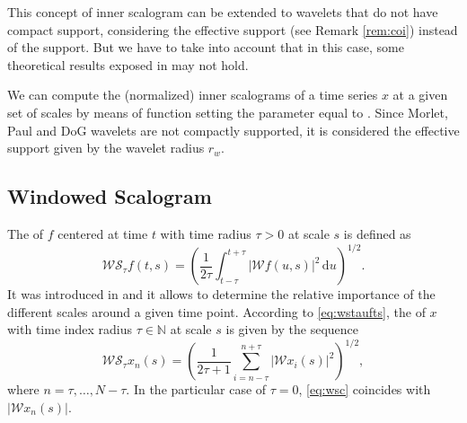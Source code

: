 This concept of inner scalogram can be extended to wavelets that do not have compact support, considering the effective support (see Remark \ref{rem:coi}) instead of the support. But we have to take into account that in this case, some theoretical results exposed in \citet{ben10} may not hold.

We can compute the (normalized) inner scalograms of a time series $x$ at a given set of scales by means of function  setting the parameter  equal to . Since Morlet, Paul and DoG wavelets are not compactly supported, it is considered the effective support given by the wavelet radius $r_w$.

\subsection{Windowed Scalogram}

The  of $f$ centered at time $t$ with time radius $\tau >0$ at scale $s$ is defined as
\begin{equation}
\label{eq:wstaufts}
\mathcal{WS}_{\tau }f(t,s) = \left( \frac{1}{2\tau }\int _{t-\tau } ^{t+\tau } | \mathcal{W}f\left( u,s\right) | ^2 \, \textrm{d}u \right)^{1/2}.
\end{equation}
It was introduced in \citet{bol17} and it allows to determine the relative importance of the different scales around a given time point. According to \eqref{eq:wstaufts}, the  of $x$ with time index radius $\tau \in \mathbb{N}$ at scale $s$ is given by the sequence
\begin{equation}
\label{eq:wsc}
\mathcal{WS}_{\tau }x_n(s) = \left( \frac{1}{2\tau +1}\sum _{i=n-\tau}^{n+\tau} | \mathcal{W}x_i(s) | ^2 \right) ^{1/2},
\end{equation}
where $n=\tau ,\ldots ,N-\tau $. In the particular case of $\tau =0$, \eqref{eq:wsc} coincides with $| \mathcal{W}x_n(s) |$.

